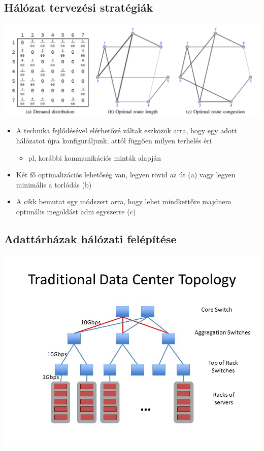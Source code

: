 \documentclass[12pt]{report}
\begin{document}
\subsection{Hálózat tervezési stratégiák}

\begin{center}
	\includegraphics[width=14cm]{pictures/example.png}
\end{center}

\begin{itemize}
	\item A technika fejlődésével elérhetővé váltak eszközök arra, hogy egy adott hálózatot újra konfiguráljunk, attól függően milyen terhelés éri
	\begin{itemize}
		\item pl, korábbi kommunikációs minták alapján
	\end{itemize}
	\item Két fő optimalizációs lehetőség van, legyen rövid az út (a) vagy legyen minimális a torlódás (b)
	\item A cikk bemutat egy módszert arra, hogy lehet mindkettőre majdnem optimális megoldást adni egyszerre (c)
\end{itemize}



\subsection{Adattárházak hálózati felépítése}

\begin{center}
	\includegraphics[width=0.7\linewidth]{pictures/Traditional+Data+Center+Topology.jpg}
\end{center}
\end{document}
